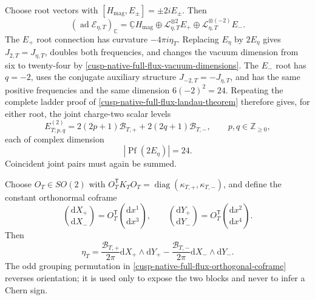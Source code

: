 Choose root vectors with
\([H_{\mathrm{mag}},E_\pm]=\pm2iE_\pm\).  Then
\begin{equation}
 (\operatorname{ad}\mathscr E_{\eta,T})_{\mathbb C}
 =\underline{\mathbb C}H_{\mathrm{mag}}
 \oplus\mathscr L_{\eta,T}^{\otimes2}E_+
 \oplus\mathscr L_{\eta,T}^{\otimes(-2)}E_-.
 \label{cusp-native-full-flux-root-decomposition}
\end{equation}
The \(E_+\) root connection has curvature \(-4\pi i\eta_T\).  Replacing
\(E_\eta\) by \(2E_\eta\) gives \(J_{2,T}=J_{\eta,T}\), doubles both
frequencies, and changes the vacuum dimension from six to twenty-four by
\cref{cusp-native-full-flux-vacuum-dimensions}.  The \(E_-\) root has
\(q=-2\), uses the conjugate auxiliary structure
\(J_{-2,T}=-J_{\eta,T}\), and has the same positive frequencies and the same
dimension \(6(-2)^2=24\).  Repeating the complete ladder proof of
\cref{cusp-native-full-flux-landau-theorem} therefore gives, for either root,
the joint charge-two scalar levels
\begin{equation}
 E^{(2)}_{T;p,q}
 =2(2p+1)\mathcal B_{T,+}+2(2q+1)\mathcal B_{T,-},
 \qquad p,q\in\mathbb Z_{\ge0},
 \label{cusp-native-full-flux-charge-two-levels}
\end{equation}
each of complex dimension
\begin{equation}
 |\operatorname{Pf}(2E_\eta)|=24.
 \label{cusp-native-full-flux-charge-two-multiplicity}
\end{equation}
Coincident joint pairs must again be summed.

Choose \(O_T\in SO(2)\) with
\(O_T^{\mathsf T}K_TO_T=\operatorname{diag}(\kappa_{T,+},\kappa_{T,-})\),
and define the constant orthonormal coframe
\begin{equation}
 \binom{\mathrm dX_+}{\mathrm dX_-}
 =O_T^{\mathsf T}\binom{\mathrm dx^1}{\mathrm dx^3},
 \qquad
 \binom{\mathrm dY_+}{\mathrm dY_-}
 =O_T^{\mathsf T}\binom{\mathrm dx^2}{\mathrm dx^4}.
 \label{cusp-native-full-flux-orthogonal-coframe}
\end{equation}
Then
\begin{equation}
 \eta_T=\frac{\mathcal B_{T,+}}{2\pi}
          \mathrm dX_+\wedge\mathrm dY_+
         -\frac{\mathcal B_{T,-}}{2\pi}
          \mathrm dX_-\wedge\mathrm dY_-.
 \label{cusp-native-full-flux-normal-form}
\end{equation}
The odd grouping permutation in
\cref{cusp-native-full-flux-orthogonal-coframe} reverses orientation; it is
used only to expose the two blocks and never to infer a Chern sign.

